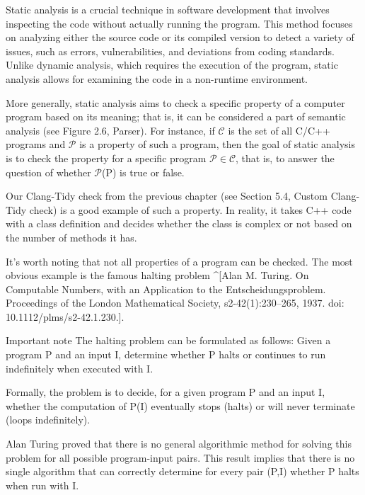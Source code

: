 Static analysis is a crucial technique in software development that involves inspecting the code without actually running the program. This method focuses on analyzing either the source code or its compiled version to detect a variety of issues, such as errors, vulnerabilities, and deviations from coding standards. Unlike dynamic analysis, which requires the execution of the program, static analysis allows for examining the code in a non-runtime environment.

More generally, static analysis aims to check a specific property of a computer program based on its meaning; that is, it can be considered a part of semantic analysis (see Figure 2.6, Parser). For instance, if $\mathcal{C}$ is the set of all C/C++ programs and $\mathcal{P}$ is a property of such a program, then the goal of static analysis is to check the property for a specific program $\mathcal{P} \in \mathcal{C}$, that is, to answer the question of whether $\mathcal{P}$(P) is true or false.

Our Clang-Tidy check from the previous chapter (see Section 5.4, Custom Clang-Tidy check) is a good example of such a property. In reality, it takes C++ code with a class definition and decides whether the class is complex or not based on the number of methods it has.

\begin{markdown}
It’s worth noting that not all properties of a program can be checked. The most obvious example is the famous halting problem ^[Alan M. Turing. On Computable Numbers, with an Application to the Entscheidungsproblem. Proceedings of the London Mathematical Society, s2-42(1):230–265, 1937. doi: 10.1112/plms/s2-42.1.230.].
\end{markdown}

\begin{myNotic}{Important note}
The halting problem can be formulated as follows: Given a program P and an input I, determine whether P halts or continues to run indefinitely when executed with I.
\end{myNotic}

Formally, the problem is to decide, for a given program P and an input I, whether the computation of P(I) eventually stops (halts) or will never terminate (loops indefinitely).

Alan Turing proved that there is no general algorithmic method for solving this problem for all possible program-input pairs. This result implies that there is no single algorithm that can correctly determine for every pair (P,I) whether P halts when run with I.

